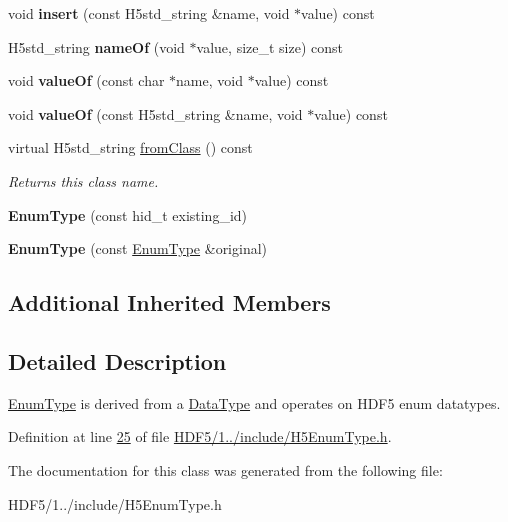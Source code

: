 \begin{DoxyCompactItemize}
void {\bfseries insert} (const H5std\+\_\+string \&name, void $\ast$value) const
\item 
\mbox{\label{class_h5_1_1_enum_type_a9828fc1ade770262d851704f163a977f}} 
H5std\+\_\+string {\bfseries name\+Of} (void $\ast$value, size\+\_\+t size) const
\item 
\mbox{\label{class_h5_1_1_enum_type_a1f10dd8285464ab53e9e0e4bfe494bde}} 
void {\bfseries value\+Of} (const char $\ast$name, void $\ast$value) const
\item 
\mbox{\label{class_h5_1_1_enum_type_ae0be904778681842777e8d210d9b5f9c}} 
void {\bfseries value\+Of} (const H5std\+\_\+string \&name, void $\ast$value) const
\item 
\mbox{\label{class_h5_1_1_enum_type_aeef68c3a71fb4d3516985007fb3410fd}} 
virtual H5std\+\_\+string \hyperlink{class_h5_1_1_enum_type_aeef68c3a71fb4d3516985007fb3410fd}{from\+Class} () const
\begin{DoxyCompactList}\small\item\em Returns this class name. \end{DoxyCompactList}\item 
\mbox{\label{class_h5_1_1_enum_type_a3fe856011081e8360bd6a81d7567e722}} 
{\bfseries Enum\+Type} (const hid\+\_\+t existing\+\_\+id)
\item 
\mbox{\label{class_h5_1_1_enum_type_a92a6b6c5843284264fdcd878533e7309}} 
{\bfseries Enum\+Type} (const \hyperlink{class_h5_1_1_enum_type}{Enum\+Type} \&original)
\end{DoxyCompactItemize}
\subsection*{Additional Inherited Members}


\subsection{Detailed Description}
\hyperlink{class_h5_1_1_enum_type}{Enum\+Type} is derived from a \hyperlink{class_h5_1_1_data_type}{Data\+Type} and operates on H\+D\+F5 enum datatypes. 

Definition at line \hyperlink{_h_d_f5_21_810_81_2include_2_h5_enum_type_8h_source_l00025}{25} of file \hyperlink{_h_d_f5_21_810_81_2include_2_h5_enum_type_8h_source}{H\+D\+F5/1../include/\+H5\+Enum\+Type.\+h}.



The documentation for this class was generated from the following file\+:\begin{DoxyCompactItemize}
\item 
H\+D\+F5/1../include/\+H5\+Enum\+Type.\+h\end{DoxyCompactItemize}
